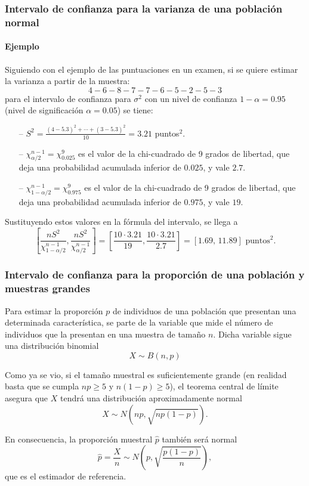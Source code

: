 \begin{frame}
\frametitle{Intervalo de confianza para la varianza de una población normal}
\framesubtitle{Ejemplo}
Siguiendo con el ejemplo de las puntuaciones en un examen, si se quiere estimar la varianza a partir de la muestra:
\[
4 - 6 - 8 - 7 - 7 - 6 - 5 - 2 - 5 - 3
\]
para el intervalo de confianza para $\sigma^2$ con un nivel de confianza $1-\alpha=0.95$ (nivel de significación $\alpha=0.05$) se tiene:
\begin{itemize}
\item[--] $S^2= \frac{(4-5.3)^2+\cdots+(3-5.3)^2}{10} = 3.21$ puntos$^2$.
\item[--] $\chi^{n-1}_{\alpha/2}=\chi^9_{0.025}$ es el valor de la chi-cuadrado de 9 grados de libertad, que deja una probabilidad acumulada
inferior de $0.025$, y vale $2.7$.
\item[--] $\chi^{n-1}_{1-\alpha/2}=\chi^9_{0.975}$ es el valor de la chi-cuadrado de 9 grados de libertad, que deja una probabilidad
acumulada inferior de $0.975$, y vale $19$.
\end{itemize}
Sustituyendo estos valores en la fórmula del intervalo, se llega a
\[
\left[\frac{nS^2}{\chi^{n-1}_{1-\alpha/2}},\frac{nS^2}{\chi^{n-1}_{\alpha/2}}\right] = 
\left[\frac{10\cdot 3.21}{19},\frac{10\cdot 3.21}{2.7}\right] = [1.69,\,11.89] \text{ puntos}^2.
\]
\end{frame}


\begin{frame}
\frametitle{Intervalo de confianza para la proporción de una población y muestras grandes}
Para estimar la proporción $p$ de individuos de una población que presentan una determinada característica, se parte de la variable que mide el número de individuos que la presentan en una muestra de tamaño $n$.
Dicha variable sigue una distribución binomial
\[
X\sim B(n,p)
\]

Como ya se vio, si el tamaño muestral es suficientemente grande (en realidad basta que se cumpla $np\geq 5$ y $n(1-p)\geq 5$), el teorema central de límite asegura que $X$ tendrá una distribución aproximadamente normal
\[
X\sim N(np,\sqrt{np(1-p)}).
\]

En consecuencia, la proporción muestral $\hat p$ también será normal
\[
\hat{p}=\frac{X}{n} \sim N\left(p,\sqrt{\frac{p(1-p)}{n}}\right),
\]
que es el estimador de referencia.
\end{frame}



